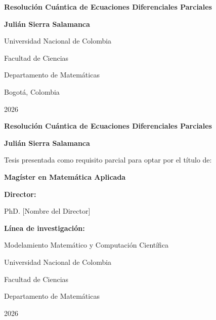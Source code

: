 \documentclass[12pt,letterpaper,twoside]{book}
\begin{document}
\begin{titlepage}
    \centering
    \vspace*{2cm}
    {\LARGE \bfseries Resolución Cuántica de Ecuaciones Diferenciales Parciales \par}
    \vspace{2cm}
    {\Large \bfseries Julián Sierra Salamanca\par}
    \vfill
    Universidad Nacional de Colombia\par
    Facultad de Ciencias\par
    Departamento de Matemáticas\par
    Bogotá, Colombia\par
    2026\par
\end{titlepage}

\begin{titlepage}
    \centering
    \vspace*{2cm}
    {\LARGE \bfseries Resolución Cuántica de Ecuaciones Diferenciales Parciales \par}
    \vspace{2cm}
    {\Large \bfseries Julián Sierra Salamanca\par}
    \vfill
    Tesis presentada como requisito parcial para optar por el título de:\par
    \vspace{0.5cm}
    {\Large \bfseries Magíster en Matemática Aplicada\par}
    \vspace{1.5cm}
    \textbf{Director:}\par
    PhD. [Nombre del Director]\par 
    \vspace{1cm}
    \textbf{Línea de investigación:}\par
    Modelamiento Matemático y Computación Científica\par 
    \vfill
    Universidad Nacional de Colombia\par
    Facultad de Ciencias\par
    Departamento de Matemáticas\par
    2026\par
\end{titlepage}

\frontmatter
\end{document}
